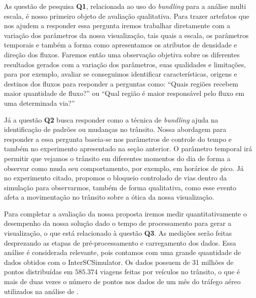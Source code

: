   As questão de pesquisa \textbf{Q1}, relacionada ao uso do \emph{bundling}
para a análise multi escala, é nosso primeiro objeto de avaliação qualitativa.
Para trazer artefatos que nos ajudem a responder essa pergunta iremos trabalhar
diretamente com a variação dos parâmetros da nossa visualização, tais quais a
escala, os parâmetros temporais e também a forma como apresentamos os atributos
de densidade e direção dos fluxos. Faremos então uma observação objetiva sobre
os diferentes resultados gerados com a variação dos parâmetros, suas qualidades
e limitações, para por exemplo, avaliar se conseguimos identificar
características, origens e destinos dos fluxos para responder a perguntas como:
``Quais regiões recebem maior quantidade de fluxo?'' ou ``Qual região é maior
responsável pelo fluxo em uma determinada via?''

  Já a questão \textbf{Q2} busca responder como a técnica de \emph{bundling}
ajuda na identificação de padrões ou mudanças no trânsito. Nossa abordagem para
responder a essa pergunta baseia-se nos parâmetros de controle do tempo e
também no experimento apresentado na seção anterior. O parâmetro temporal irá
permitir que vejamos o trânsito em diferentes momentos do dia de forma a
observar como muda seu comportamento, por exemplo, em horários de pico. Já no
experimento citado, propomos o bloqueio controlado de vias dentro da simulação
para observarmos, também de forma qualitativa, como esse evento afeta a
movimentação no trânsito sobre a ótica da nossa visualização.

  Para completar a avaliação da nossa proposta iremos medir quantitativamente o
desempenho da nossa solução dado o tempo de processamento para gerar a
visualização, o que está relacionado à questão \textbf{Q3}. As medições serão
feitas desprezando as etapas de pré-processamento e carregamento dos dados.
Essa análise é considerada relevante, pois contamos com uma grande quantidade
de dados obtidos com o InterSCSimulator. Os dados possuem de 31 milhões de
pontos distribuídas em $585.374$ viagens feitas por veículos no trânsito, o que
é mais de duas vezes o número de pontos nos dados de um mês do tráfego aéreo
utilizados na análise de \citet{Klein2014}.
